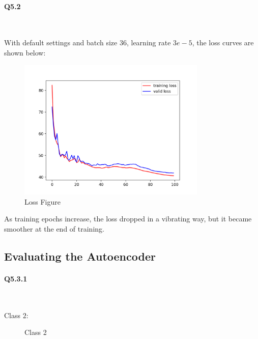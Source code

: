 \documentclass[11pt]{article} \usepackage{fullpage} \usepackage{graphicx} \usepackage{epstopdf} \usepackage{color} \usepackage{psfrag} \usepackage{pdfsync}\usepackage{indentfirst}\usepackage{subfigure}\usepackage{float}\usepackage[section]{placeins}
\begin{document}
\paragraph{Q5.2}~{}

With default settings and batch size $36$, learning rate $3e-5$, the loss curves are shown below:
\begin{figure}[H]
\centering
\includegraphics[width=0.8\textwidth]{results/q5_2_loss.png}
\caption{Loss Figure}
\end{figure}

As training epochs increase, the loss dropped in a vibrating way, but it became smoother at the end of training.

\subsection{Evaluating the Autoencoder}
\paragraph{Q5.3.1}~{}

Class $2$:
\begin{figure}[H]
\centering
{}
\caption{Class 2}
\end{figure}
\end{document}
